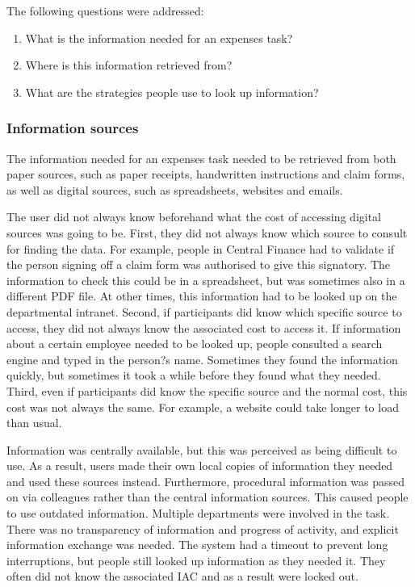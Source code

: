The following questions were addressed:

\begin{enumerate}
\item 
What is the information needed for an expenses task?
\item 
Where is this information retrieved from?
\item 
What are the strategies people use to look up information?
\end{enumerate}

\subsubsection{Information sources}
The information needed for an expenses task needed to be retrieved from both paper sources, such as paper receipts, handwritten instructions and claim forms, as well as digital sources, such as spreadsheets, websites and emails.

The user did not always know beforehand what the cost of accessing digital sources was going to be. First, they did not always know which source to consult for finding the data. For example, people in Central Finance had to validate if the person signing off a claim form was authorised to give this signatory. The information to check this could be in a spreadsheet, but was sometimes also in a different PDF file. At other times, this information had to be looked up on the departmental intranet. Second, if participants did know which specific source to access, they did not always know the associated cost to access it. If information about a certain employee needed to be looked up, people consulted a search engine and typed in the person?s name. Sometimes they found the information quickly, but sometimes it took a while before they found what they needed. Third, even if participants did know the specific source and the normal cost, this cost was not always the same. For example, a website could take longer to load than usual.

Information was centrally available, but this was perceived as being difficult to use. As a result, users made their own local copies of information they needed and used these sources instead. Furthermore, procedural information was passed on via colleagues rather than the central information sources. This caused people to use outdated information. Multiple departments were involved in the task. There was no transparency of information and progress of activity, and explicit information exchange was needed. The system had a timeout to prevent long interruptions, but people still looked up information as they needed it. They often did not know the associated IAC and as a result were locked out. 

